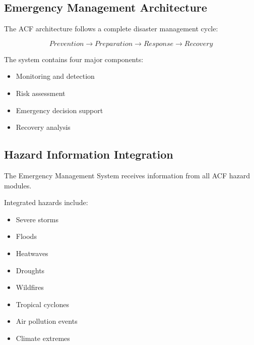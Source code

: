 
\subsection{Emergency Management Architecture}

The ACF architecture follows a complete disaster management cycle:

\[
Prevention
\rightarrow
Preparation
\rightarrow
Response
\rightarrow
Recovery
\]


The system contains four major components:

\begin{itemize}

\item Monitoring and detection

\item Risk assessment

\item Emergency decision support

\item Recovery analysis

\end{itemize}



\subsection{Hazard Information Integration}

The Emergency Management System receives information from all ACF
hazard modules.

Integrated hazards include:

\begin{itemize}

\item Severe storms

\item Floods

\item Heatwaves

\item Droughts

\item Wildfires

\item Tropical cyclones

\item Air pollution events

\item Climate extremes

\end{itemize}



